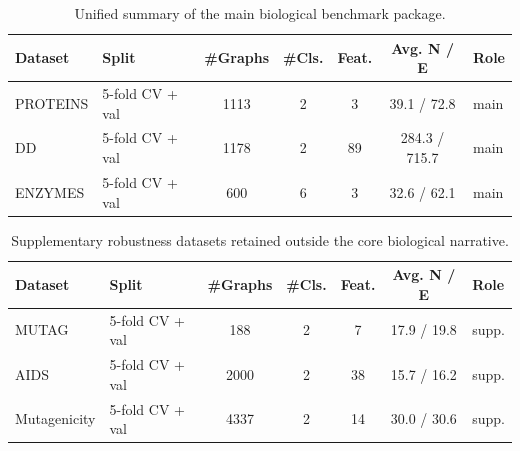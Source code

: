 \begin{table}[!t]
\centering
\small
\caption{Unified summary of the main biological benchmark package.}
\label{tab:dataset_main_package}
\setlength{\tabcolsep}{4pt}
\begin{tabular}{l l c c c c l}
\toprule
Dataset & Split & \#Graphs & \#Cls. & Feat. & Avg. N / E & Role \\
\midrule
PROTEINS & 5-fold CV + val & 1113 & 2 & 3 & 39.1 / 72.8 & main \\
DD & 5-fold CV + val & 1178 & 2 & 89 & 284.3 / 715.7 & main \\
ENZYMES & 5-fold CV + val & 600 & 6 & 3 & 32.6 / 62.1 & main \\
\bottomrule
\end{tabular}
\end{table}

\begin{table}[!t]
\centering
\small
\caption{Supplementary robustness datasets retained outside the core biological narrative.}
\label{tab:dataset_supp_package}
\setlength{\tabcolsep}{4pt}
\begin{tabular}{l l c c c c l}
\toprule
Dataset & Split & \#Graphs & \#Cls. & Feat. & Avg. N / E & Role \\
\midrule
MUTAG & 5-fold CV + val & 188 & 2 & 7 & 17.9 / 19.8 & supp. \\
AIDS & 5-fold CV + val & 2000 & 2 & 38 & 15.7 / 16.2 & supp. \\
Mutagenicity & 5-fold CV + val & 4337 & 2 & 14 & 30.0 / 30.6 & supp. \\
\bottomrule
\end{tabular}
\end{table}
